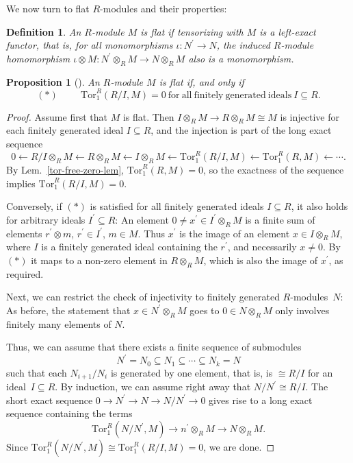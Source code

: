 \documentclass{amsart}
\theoremstyle{plain}
\numberwithin{equation}{section} %
\numberwithin{figure}{section} %
\theoremstyle{plain}
\theoremstyle{plain}
\theoremstyle{plain}
\theoremstyle{plain}
\theoremstyle{plain}
\newtheorem{prop}[thm]{Proposition} %
\theoremstyle{plain}
\newtheorem{Def}[thm]{Definition} %
\theoremstyle{remark}
\theoremstyle{remark}
\theoremstyle{remark}
\begin{document}
We now turn to flat $R$-modules and their properties:
\begin{Def}
An $R$-module $M$ is flat if tensorizing with $M$ is a left-exact functor, that is, for all monomorphisms $\iota: N^\prime \rightarrow N$, the induced $R$-module homomorphism $\iota \otimes M : N^\prime \otimes_R M \rightarrow N \otimes_R M$ also is a monomorphism.
\end{Def}
\begin{prop}[{\cite[Prop.6.1]{ECA}}] \label{Tor-flat-crit}
An $R$-module $M$ is flat if, and only if 
\[(\ast) \hspace{1cm} \mathrm{Tor}_1^R(R/I,M) = 0\ \mathrm{for\ all\ finitely\ generated\ ideals\ } I \subseteq R. \]
\end{prop}
\begin{proof}
Assume first that $M$ is flat. Then $I \otimes_R M \rightarrow R \otimes_R M \cong M$ is injective for each finitely generated ideal $I \subseteq R$, and the injection is part of the long exact sequence
\[0 \leftarrow R/I \otimes_R M \leftarrow R \otimes_R M \leftarrow I \otimes_R M \leftarrow \mathrm{Tor}_1^R(R/I,M) \leftarrow \mathrm{Tor}_1^R(R,M) \leftarrow \cdots . \]
By Lem.~\ref{tor-free-zero-lem}, $\mathrm{Tor}_1^R(R,M) = 0$, so the exactness of the sequence implies $\mathrm{Tor}_1^R(R/I,M) = 0$. 

Conversely,  if $(\ast)$ is satisfied for all finitely generated ideals $I \subseteq R$, it also holds for arbitrary ideals $I^\prime \subseteq R$: An element $0 \neq x^\prime \in I^\prime \otimes_R M$ is a finite sum of elements $r^\prime \otimes m$, $r^\prime \in I^\prime$, $m \in M$. Thus $x^\prime$ is the image of an element $x \in I \otimes_R M$, where $I$ is a finitely generated ideal containing the $r^\prime$, and necessarily $x \neq 0$. By $(\ast)$ it maps to a non-zero element in $R \otimes_R M$, which is also the image of $x^\prime$, as required.

Next, we can restrict the check of injectivity to finitely generated $R$-modules~$N$: As before, the statement that $x \in N^\prime \otimes_R M$ goes to $0 \in N \otimes_R M$ only involves finitely many elements of $N$.

Thus, we can assume that there exists a finite sequence of submodules
\[ N^\prime = N_0 \subseteq N_1 \subseteq \cdots \subseteq  N_k = N \]
such that each $N_{i+1}/N_i$ is generated by one element, that is, is $\cong R/I$ for an ideal~$I \subseteq R$. By induction, we can assume right away that $N/N^\prime \cong R/I$. The short exact sequence $0 \rightarrow N^\prime \rightarrow N \rightarrow N/N^\prime \rightarrow 0$ gives rise to a long exact sequence containing the terms 
\[ \mathrm{Tor}_1^R(N/N^\prime,M) \rightarrow n^\prime \otimes_R M \rightarrow N \otimes_R M. \]
Since $\mathrm{Tor}_1^R(N/N^\prime,M) \cong \mathrm{Tor}_1^R(R/I,M) = 0$, we are done.
\end{proof}
\end{document}
